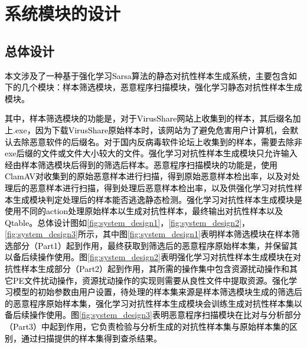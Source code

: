 
\chapter{系统模块的设计}

\section{总体设计}

\textcolor{black}{本文涉及了一种基于强化学习Sarsa算法的静态对抗性样本生成系统，主要包含如下的几个模块：样本筛选模块，恶意程序扫描模块，强化学习静态对抗性样本生成模块。}

\textcolor{black}{其中，样本筛选模块的功能是，对于VirusShare网站上收集到的样本，其后缀名加上.exe，因为下载VirusShare原始样本时，该网站为了避免危害用户计算机，会默认去除恶意软件的后缀名。对于国内反病毒软件论坛上收集到的样本，需要去除非exe后缀的文件或文件大小较大的文件。强化学习对抗性样本生成模块只允许输入经由样本筛选模块后得到的筛选后样本。恶意程序扫描模块的功能是，使用ClamAV对收集到的原始恶意样本进行扫描，得到原始恶意样本检出率，以及对处理后的恶意样本进行扫描，得到处理后恶意样本检出率，以及供强化学习对抗性样本生成模块判定处理后的样本能否逃逸静态检测。强化学习对抗性样本生成模块是使用不同的action处理原始样本以生成对抗性样本，最终输出对抗性样本以及Qtable。总体设计图如\ref{fig:system_design1}，\ref{fig:system_design2}，\ref{fig:system_design3}所示，其中图\ref{fig:system_design1}表明样本筛选模块在样本筛选部分（Part1）起到作用，最终获取到筛选后的恶意程序原始样本集，并保留其以备后续操作使用。图\ref{fig:system_design2}表明强化学习对抗性样本生成模块在对抗性样本生成部分（Part2）起到作用，其所需的操作集中包含资源扰动操作和其它PE文件扰动操作，资源扰动操作的实现则需要从良性文件中提取资源。强化学习模型的初始参数由用户设置，待处理的样本集来源是样本筛选模块生成的筛选后的恶意程序原始样本集，强化学习对抗性样本生成模块会训练生成对抗性样本集以备后续操作使用。图\ref{fig:system_design3}表明恶意程序扫描模块在比对与分析部分（Part3）中起到作用，它负责检验与分析生成的对抗性样本集与原始样本集的区别，通过扫描提供的样本集得到查杀结果。}

